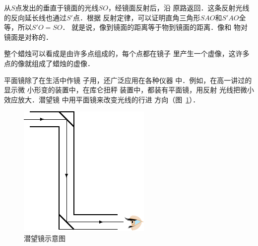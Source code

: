 从$S$点发出的垂直于镜面的光线$SO$，经镜面反射后，沿
原路返回．这条反射光线的反向延长线也通过$S'$点．根据
反射定律，可以证明直角三角形$SAO$和$S'AO$全等，所以$S'O=SO$．
就是说，像到镜面的距离等于物到镜面的距离．像和
物对镜面是对称的．

整个蜡烛可以看成是由许多点组成的，每个点都在镜子
里产生一个虚像，这许多点的像就组成了蜡烛的虚像．

平面镜除了在生活中作镜
子用，还广泛应用在各种仪器
中．例如，在高一讲过的显示微
小形变的装置中，在库仑扭秤
装置中，都装有平面镜，用反射
光线把微小效应放大．潜望镜
中用平面镜来改变光线的行进
方向（图~\ref{fig_C_5-11}）．
\begin{figure}[htbp]
    \centering
    \includegraphics{fig/C/5-11.pdf}
    \caption{潜望镜示意图}\label{fig_C_5-11}
\end{figure}

